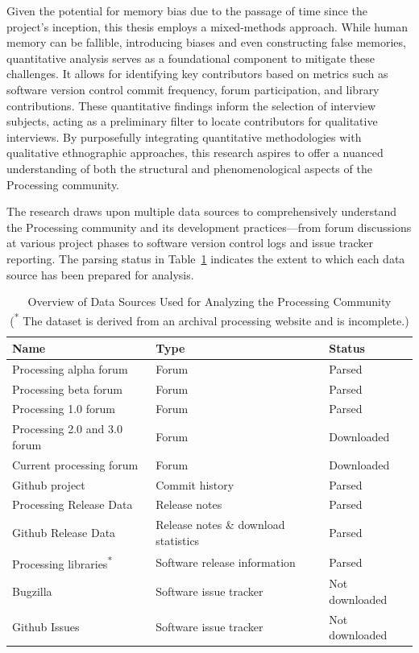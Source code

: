 Given the potential for memory bias due to the passage of time since the project’s inception, this thesis employs a mixed-methods approach. While human memory can be fallible, introducing biases and even constructing false memories, quantitative analysis serves as a foundational component to mitigate these challenges. It allows for identifying key contributors based on metrics such as software version control commit frequency, forum participation, and library contributions. These quantitative findings inform the selection of interview subjects, acting as a preliminary filter to locate contributors for qualitative interviews.
By purposefully integrating quantitative methodologies with qualitative ethnographic approaches, this research aspires to offer a nuanced understanding of both the structural and phenomenological aspects of the Processing community.

The research draws upon multiple data sources to comprehensively understand the Processing community and its development practices—from forum discussions at various project phases to software version control logs and issue tracker reporting. The parsing status in Table~\ref{tab:data-sources} indicates the extent to which each data source has been prepared for analysis. 
%      

\begin{table}
    \begin{adjustbox}{center}
    \begin{tabular}{l l l}
        \toprule
        Name & Type & Status \\
        \midrule
        Processing alpha forum & Forum & Parsed \\
        Processing beta forum & Forum & Parsed  \\
        Processing 1.0 forum & Forum & Parsed \\
        Processing 2.0 and 3.0 forum & Forum  & Downloaded \\
        Current processing forum & Forum & Downloaded \\
        Github project & Commit history & Parsed \\
        Processing Release Data & Release notes & Parsed \\
        Github Release Data & Release notes \& download statistics & Parsed \\
        Processing libraries\textsuperscript{*} & Software release information & Parsed \\
        Bugzilla & Software issue tracker & Not downloaded \\
        Github Issues & Software issue tracker & Not downloaded \\
        \bottomrule
    \end{tabular}
    \end{adjustbox}
    \caption[Data Sources]{Overview of Data Sources Used for Analyzing the Processing Community\\(\textsuperscript{*} The dataset is derived from an archival processing website and is incomplete.)}
    \label{tab:data-sources}
  \end{table}

